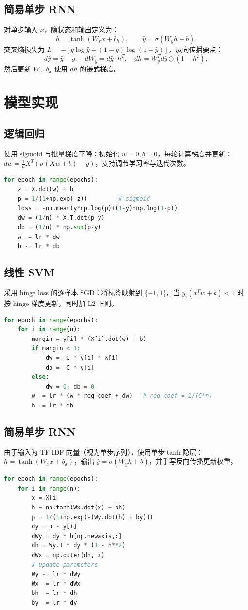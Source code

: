 \subsection{简易单步 RNN}
对单步输入 $x$，隐状态和输出定义为：
$$h=\tanh(W_x x + b_h),\qquad \hat y=\sigma(W_y h + b).$$
交叉熵损失为 $L=-[y\log\hat y+(1-y)\log(1-\hat y)]$，反向传播要点：
$$d\hat y=\hat y-y,\quad dW_y = d\hat y\cdot h^T,\quad dh = W_y^T d\hat y \odot (1-h^2),$$
然后更新 $W_x,b_h$ 使用 $dh$ 的链式梯度。

\section{模型实现}
\subsection{逻辑回归}
使用 sigmoid 与批量梯度下降：初始化 $w=0,b=0$，每轮计算梯度并更新：$dw=\frac{1}{n}X^T(\sigma(Xw+b)-y)$，支持调节学习率与迭代次数。
\begin{lstlisting}[language=Python, style=cleanpython, caption={逻辑回归核心训练代码（伪代码）}]
for epoch in range(epochs):
    z = X.dot(w) + b
    p = 1/(1+np.exp(-z))         # sigmoid
    loss = -np.mean(y*np.log(p)+(1-y)*np.log(1-p))
    dw = (1/n) * X.T.dot(p-y)
    db = (1/n) * np.sum(p-y)
    w -= lr * dw
    b -= lr * db
\end{lstlisting}

\subsection{线性 SVM }
采用 hinge loss 的逐样本 SGD：将标签映射到 $\{-1,1\}$，当 $y_i (x_i^T w + b) < 1$ 时按 hinge 梯度更新，同时加 L2 正则。
\begin{lstlisting}[language=Python, style=cleanpython, caption={SVM (hinge loss + SGD) 关键步骤（伪代码）}]
for epoch in range(epochs):
    for i in range(n):
        margin = y[i] * (X[i].dot(w) + b)
        if margin < 1:
            dw = -C * y[i] * X[i]
            db = -C * y[i]
        else:
            dw = 0; db = 0
        w -= lr * (w * reg_coef + dw)   # reg_coef = 1/(C*n)
        b -= lr * db
\end{lstlisting}


\subsection{简易单步 RNN }
由于输入为 TF-IDF 向量（视为单步序列），使用单步 tanh 隐层：$h=\tanh(W_x x + b_h)$，输出 $\hat y=\sigma(W_y h + b)$，并手写反向传播更新权重。
\begin{lstlisting}[language=Python, style=cleanpython, caption={简易 RNN 训练关键步骤（伪代码）}]
for epoch in range(epochs):
    for i in range(n):
        x = X[i]
        h = np.tanh(Wx.dot(x) + bh)
        p = 1/(1+np.exp(-(Wy.dot(h) + by)))
        dy = p - y[i]
        dWy = dy * h[np.newaxis,:]
        dh = Wy.T * dy * (1 - h**2)
        dWx = np.outer(dh, x)
        # update parameters
        Wy -= lr * dWy
        Wx -= lr * dWx
        bh -= lr * dh
        by -= lr * dy
\end{lstlisting}

